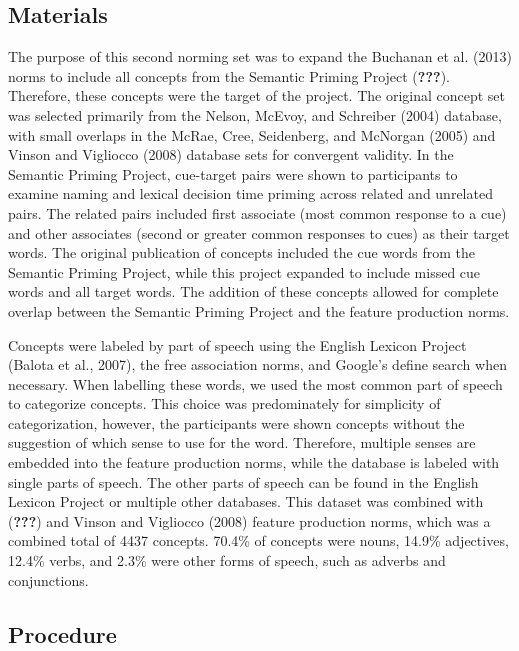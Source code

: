 \documentclass[english,man]{apa6}
\theoremstyle{definition}
\theoremstyle{definition}
\theoremstyle{definition}
\theoremstyle{remark}
\begin{document}
\subsection{Materials}\label{materials}

The purpose of this second norming set was to expand the Buchanan et al.
(2013) norms to include all concepts from the Semantic Priming Project
({\textbf{???}}). Therefore, these concepts were the target of the
project. The original concept set was selected primarily from the
Nelson, McEvoy, and Schreiber (2004) database, with small overlaps in
the McRae, Cree, Seidenberg, and McNorgan (2005) and Vinson and
Vigliocco (2008) database sets for convergent validity. In the Semantic
Priming Project, cue-target pairs were shown to participants to examine
naming and lexical decision time priming across related and unrelated
pairs. The related pairs included first associate (most common response
to a cue) and other associates (second or greater common responses to
cues) as their target words. The original publication of concepts
included the cue words from the Semantic Priming Project, while this
project expanded to include missed cue words and all target words. The
addition of these concepts allowed for complete overlap between the
Semantic Priming Project and the feature production norms.

Concepts were labeled by part of speech using the English Lexicon
Project (Balota et al., 2007), the free association norms, and Google's
define search when necessary. When labelling these words, we used the
most common part of speech to categorize concepts. This choice was
predominately for simplicity of categorization, however, the
participants were shown concepts without the suggestion of which sense
to use for the word. Therefore, multiple senses are embedded into the
feature production norms, while the database is labeled with single
parts of speech. The other parts of speech can be found in the English
Lexicon Project or multiple other databases. This dataset was combined
with ({\textbf{???}}) and Vinson and Vigliocco (2008) feature production
norms, which was a combined total of 4437 concepts. 70.4\% of concepts
were nouns, 14.9\% adjectives, 12.4\% verbs, and 2.3\% were other forms
of speech, such as adverbs and conjunctions.

\subsection{Procedure}\label{procedure}
\end{document}
